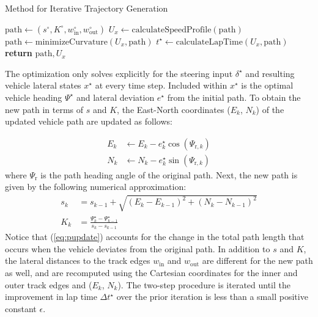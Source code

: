 \documentclass[twocolumn,10pt]{asme2ej}
\begin{document}
 \begin{algorithm}
 \caption{Method for Iterative Trajectory Generation}
  \label{alg:genTraj}
\begin{algorithmic}[1]
\State $\mathrm{path}\gets (s^\circ, K^\circ, w_\mathrm{in}^\circ, w_\mathrm{out}^\circ)$
\State $U_x \gets \mathrm{calculateSpeedProfile(path)}$
\State $\mathrm{path} \gets \mathrm{minimizeCurvature}(U_x, \mathrm{path})$
\State $t^\star \gets \mathrm{calculateLapTime}(U_x,\mathrm{path})$
\EndWhile
\State \textbf{return} $\mathrm{path},U_x$
\EndProcedure
\end{algorithmic}
\end{algorithm}
 
The optimization only solves explicitly for the steering input $\delta^\star$ and resulting vehicle lateral states $x^\star$ at every 
time step. Included within $x^\star$  is the optimal vehicle heading $\Psi^\star$ and lateral deviation $e^\star$ from the initial path. To obtain 
the new path in terms of $s$ and $K$, the East-North coordinates ($E_k$, $N_k$) of the updated vehicle path are updated as follows:
	
\begin{subequations}
\begin{align}
	E_k &\gets E_k - e^\star_k\cos(\Psi_{\mathrm{r},k})\\
	N_k &\gets N_k - e^\star_k\sin(\Psi_{\mathrm{r},k})
\end{align}
\end{subequations}
where $\Psi_\mathrm{r}$ is the path heading angle of the original path. Next, the new path is given by the following numerical approximation:
 \begin{subequations}
 \label{eq:pupdate}
\begin{align}
	s_k &= s_{k-1} + \sqrt{(E_k - E_{k-1})^2 + (N_k - N_{k-1})^2}\\ 
	K_k &= \frac{\Psi^\star_k - \Psi^\star_{k-1}}{s_k - s_{k-1}}
\end{align}
\end{subequations}
 Notice that (\ref{eq:pupdate}) accounts for the change in the total path length that occurs when the vehicle deviates from the original path.
 In addition to $s$ and $K$, the lateral distances to the track edges $w_\mathrm{in}$ and $w_\mathrm{out}$ are different for the new path
 as well, and are recomputed using the Cartesian coordinates for
the inner and outer track edges and ($E_k$, $N_k$). The two-step procedure is iterated until the improvement in lap time $\Delta t^\star$ over the prior iteration is less than a small positive 
constant $\epsilon$.
\end{document}
